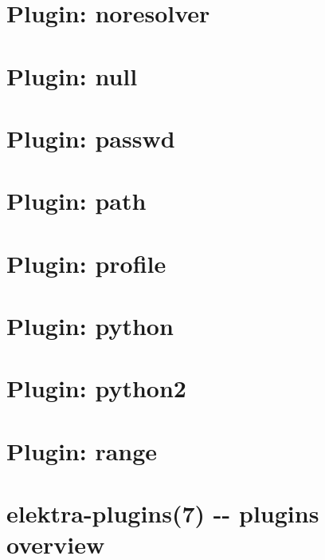 \documentclass[twoside]{book}
\newcommand{\+}{\discretionary{\mbox{\scriptsize$\hookleftarrow$}}{}{}}
\begin{document}
\chapter{Plugin\+: noresolver}
\label{md_src_plugins_noresolver_README}

\chapter{Plugin\+: null}
\label{md_src_plugins_null_README}

\chapter{Plugin\+: passwd}
\label{md_src_plugins_passwd_README}

\chapter{Plugin\+: path}
\label{md_src_plugins_path_README}

\chapter{Plugin\+: profile}
\label{md_src_plugins_profile_README}

\chapter{Plugin\+: python}
\label{md_src_plugins_python_README}

\chapter{Plugin\+: python2}
\label{md_src_plugins_python2_README}

\chapter{Plugin\+: range}
\label{md_src_plugins_range_README}

\chapter{elektra-\/plugins(7) -\/-\/ plugins overview}
\label{md_src_plugins_README}

\end{document}
